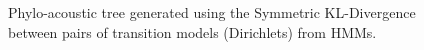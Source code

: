 \documentclass[pdftex,11pt,a4paper]{article}
\theoremstyle{definition}
\theoremstyle{remark}
\begin{document}
\begin{figure}
\noindent{}
    \caption{Phylo-acoustic tree generated using the Symmetric KL-Divergence between pairs of transition models (Dirichlets) from HMMs.}
    \label{fig:hmmunweighted}
\end{figure}
\end{document}
